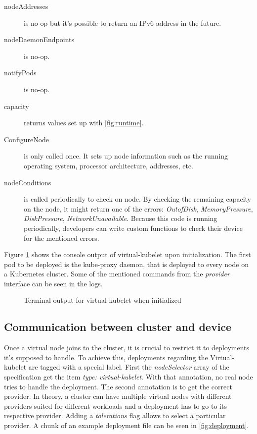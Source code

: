 \begin{description}
  \item [nodeAddresses] is no-op but it's possible to return an IPv6 address in the future.
  \item [nodeDaemonEndpoints] is no-op.
  \item [notifyPods] is no-op.
  \item [capacity] returns values set up with \ref{fig:runtime}.
  \item [ConfigureNode] is only called once. It sets up node information such as the running operating system, processor architecture, addresses, etc.
  \item [nodeConditions] is called periodically to check on node. By checking the remaining capacity on the node, it might return one of the errors: \textit{OutofDisk}, \textit{MemoryPressure}, \textit{DiskPressure}, \textit{NetworkUnavailable}. Because this code is running periodically, developers can write custom functions to check their device for the mentioned errors.
  \end{description}

  Figure \ref{fig:output} shows the console output of virtual-kubelet upon initialization. The first pod to be deployed is the kube-proxy daemon, that is deployed to every node on a Kubernetes cluster. Some of the mentioned commands from the \textit{provider} interface can be seen in the logs.

\begin{figure}[!h]
  \centering
  \caption{Terminal output for virtual-kubelet when initialized} \label{fig:output}
\end{figure}

\subsection{Communication between cluster and device}
Once a virtual node joins to the cluster, it is crucial to restrict it to deployments it's supposed to handle. To achieve this, deployments regarding the Virtual-kubelet are tagged with a special label. First the \textit{nodeSelector} array of the specification get the item \textit{type: virtual-kubelet}. With that annotation, no real node tries to handle the deployment. The second annotation is to get the correct provider. In theory, a cluster can have multiple virtual nodes with different providers suited for different workloads and a deployment has to go to its respective provider. Adding a \textit{tolerations} flag allows to select a particular provider. A chunk of an example deployment file can be seen in \ref{fig:deployment}.

